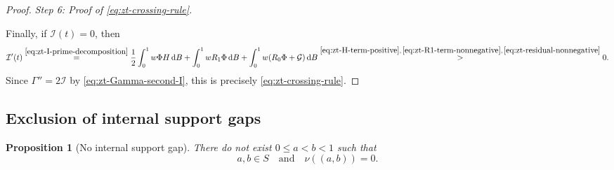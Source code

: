 \documentclass[10pt]{amsart}
\newtheorem{proposition}[proposition]{Proposition}
\theoremstyle{definition}
\theoremstyle{remark}
\numberwithin{equation}{section}
\newcommand{\1}{\mathbf 1}
\newcommand{\cI}{\mathcal I}
\newcommand{\cG}{\mathcal G}
\newcommand{\dd}{\,\mathrm d}
\newcommand{\stackref}[2]{\stackrel{#2}{#1}}
\begin{document}
\begin{proof}
\smallskip
\noindent\emph{Step 6: Proof of \eqref{eq:zt-crossing-rule}.}

Finally, if $\cI(t)=0$, then
\begin{equation*}
 \cI'(t)
 \stackref{=}{\eqref{eq:zt-I-prime-decomposition}}
 \frac12\int_0^1w\Phi H\dd B
 +\int_0^1wR_1\Phi\dd B
 +\int_0^1w(R_0\Phi+\cG)\dd B
 \stackref{>}{\eqref{eq:zt-H-term-positive},\,\eqref{eq:zt-R1-term-nonnegative},\,\eqref{eq:zt-residual-nonnegative}}0.
\end{equation*}
Since $\Gamma''=2\cI$ by \eqref{eq:zt-Gamma-second-I}, this is precisely \eqref{eq:zt-crossing-rule}.
\end{proof}

\subsection{Exclusion of internal support gaps}
\label{sec:zt-internal-gaps}

\begin{proposition}[No internal support gap]
\label{prop:zt-no-internal-gap}
There do not exist $0\leq a<b<1$ such that
\begin{equation*}
 a,b\in S\quad\text{and}\quad \nu((a,b))=0.
\end{equation*}
\end{proposition}
\end{document}

